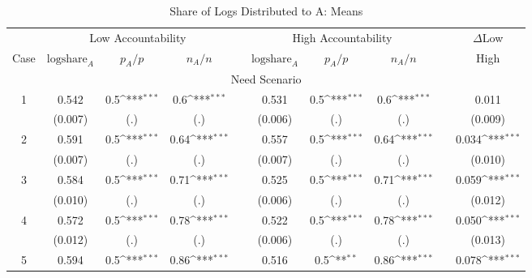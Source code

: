 \documentclass[smallcondensed]{svjour3}
\begin{document}
\begin{table}
\centering
\caption{Share of Logs Distributed to A: Means}\label{tab:share_means}
{\footnotesize
\def\sym#1{\ifmmode^{#1}\else\(^{#1}\)\fi}
\begin{tabularx}{13.5cm}{cccccccccc}\hline
          & \multicolumn{3}{c}{Low Accountability}                     &   & \multicolumn{3}{c}{High Accountability}                   &   & $\Delta$Low       \\\cline{2-4}\cline{6-8}
   Case   & $\mbox{logshare}_A$   & $p_A/p$        & $n_A/n$           &   & $\mbox{logshare}_A$   & $p_A/p$         & $n_A/n$         &   & High              \\\hline\hline
   \multicolumn{10}{c}{Need Scenario}                                                                                                                          \\
   1      &   0.542               & 0.5\sym{***}   &  0.6\sym{***}     &   &  0.531                &  0.5\sym{***}   & 0.6\sym{***}    &   &  0.011            \\
          & (0.007)               & (.)            &  (.)              &   & (0.006)               &  (.)            & (.)             &   & (0.009)           \\
   2      &  0.591                & 0.5\sym{***}   &  0.64\sym{***}    &   &  0.557                &  0.5\sym{***}   & 0.64\sym{***}   &   &  0.034\sym{***}   \\
          & (0.007)               & (.)            &  (.)              &   & (0.007)               &  (.)            & (.)             &   & (0.010)           \\
   3      &  0.584                & 0.5\sym{***}   &  0.71\sym{***}    &   &  0.525                &  0.5\sym{***}   & 0.71\sym{***}   &   &  0.059\sym{***}   \\
          & (0.010)               & (.)            &  (.)              &   & (0.006)               &  (.)            & (.)             &   & (0.012)           \\
   4      &  0.572                & 0.5\sym{***}   &  0.78\sym{***}    &   &  0.522                &  0.5\sym{***}   & 0.78\sym{***}   &   &  0.050\sym{***}   \\
          & (0.012)               & (.)            &  (.)              &   & (0.006)               &  (.)            & (.)             &   & (0.013)           \\
   5      &  0.594                & 0.5\sym{***}   &  0.86\sym{***}    &   &  0.516                &  0.5\sym{**}    & 0.86\sym{***}   &   &  0.078\sym{***}   \\

\end{tabularx}}
\end{table}
\end{document}
